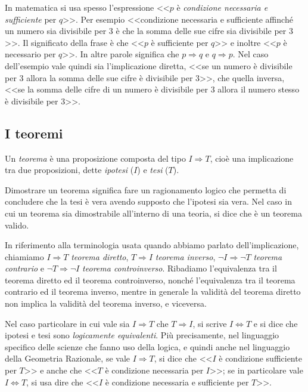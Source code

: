 In matematica si usa spesso l'espressione <<$p$ è \emph{condizione necessaria e sufficiente} per $q$>>. Per esempio <<condizione necessaria e sufficiente affinché un numero sia divisibile per $3$ è che la somma delle sue cifre sia divisibile per $3$>>. Il significato della frase è che <<$p$ è sufficiente per $q$>> e inoltre <<$p$ è necessario per $q$>>. In altre parole significa che  $p\Rightarrow q$ e $q\Rightarrow p$. Nel caso dell'esempio vale quindi sia l'implicazione diretta, <<se un numero è divisibile per $3$ allora la somma delle sue cifre è divisibile per $3$>>, che quella inversa, <<se la somma delle cifre di un numero è divisibile per $3$ allora il numero stesso è divisibile per $3$>>.

\vspazio\ovalbox{\risolvii \ref{ese:1.15}, \ref{ese:1.16}, \ref{ese:1.17}}


\subsection{I teoremi}

Un \emph{teorema} è una proposizione composta del tipo  $I\Rightarrow T$, cioè una implicazione tra due proposizioni, dette \emph{ipotesi} ($I$) e \emph{tesi} ($T$).

Dimostrare un teorema significa fare un ragionamento logico che permetta di concludere che la tesi è vera avendo supposto che l'ipotesi sia vera. Nel caso in cui un teorema sia dimostrabile all'interno di una teoria, si dice che è un teorema valido.

In riferimento alla terminologia usata quando abbiamo parlato dell'implicazione, chiamiamo  $I\Rightarrow T$ \emph{teorema diretto}, $T\Rightarrow I$ \emph{teorema inverso}, $\neg I\Rightarrow \neg T$ \emph{teorema contrario} e $\neg T\Rightarrow \neg I$ \emph{teorema controinverso}. Ribadiamo l'equivalenza tra il teorema diretto ed il teorema controinverso, nonché l'equivalenza tra il teorema contrario ed il teorema inverso, mentre in generale la validità del teorema diretto non implica la validità del teorema inverso, e viceversa.

Nel caso particolare in cui vale sia $I\Rightarrow T$ che $T\Rightarrow I$, si scrive  $I\Leftrightarrow T$ e si dice che ipotesi e tesi sono \emph{logicamente equivalenti}. Più precisamente, nel linguaggio specifico delle scienze che fanno uso della logica, e quindi anche nel linguaggio della Geometria Razionale, se vale $I\Rightarrow T$, si dice che <<$I$ è condizione sufficiente per $T$>> e anche che <<$T$ è condizione necessaria per $I$>>; se in particolare vale  $I\Leftrightarrow T$, si usa dire che <<$I$ è condizione necessaria e sufficiente per $T$>>.

